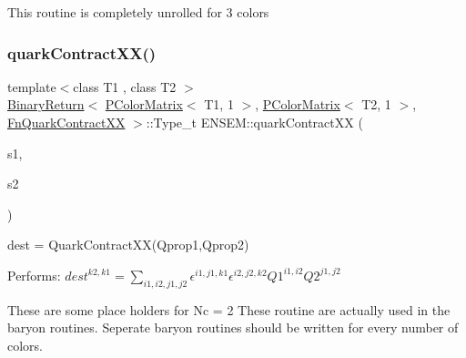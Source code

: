 This routine is completely unrolled for 3 colors \mbox{\label{group__primcolormatrix_gadb40ddb5edfab27bf7bb4b8cd7430ad6}} 
\subsubsection{\texorpdfstring{quarkContractXX()}{quarkContractXX()}\hspace{0.1cm}{\footnotesize\ttfamily [2/4]}}
{\footnotesize\ttfamily template$<$class T1 , class T2 $>$ \\
\mbox{\hyperlink{structENSEM_1_1BinaryReturn}{Binary\+Return}}$<$ \mbox{\hyperlink{classENSEM_1_1PColorMatrix}{P\+Color\+Matrix}}$<$ T1, 1 $>$, \mbox{\hyperlink{classENSEM_1_1PColorMatrix}{P\+Color\+Matrix}}$<$ T2, 1 $>$, \mbox{\hyperlink{structENSEM_1_1FnQuarkContractXX}{Fn\+Quark\+Contract\+XX}} $>$\+::Type\+\_\+t E\+N\+S\+E\+M\+::quark\+Contract\+XX (\begin{DoxyParamCaption}\item[{const \mbox{\hyperlink{classENSEM_1_1PColorMatrix}{P\+Color\+Matrix}}$<$ T1, 1 $>$ \&}]{s1,  }\item[{const \mbox{\hyperlink{classENSEM_1_1PColorMatrix}{P\+Color\+Matrix}}$<$ T2, 1 $>$ \&}]{s2 }\end{DoxyParamCaption})\hspace{0.3cm}{\ttfamily [inline]}}



dest = Quark\+Contract\+X\+X(\+Qprop1,\+Qprop2) 

Performs\+: $dest^{k2,k1} = \sum_{i1,i2,j1,j2} \epsilon^{i1,j1,k1}\epsilon^{i2,j2,k2} Q1^{i1,i2} Q2^{j1,j2}$

These are some place holders for Nc = 2 These routine are actually used in the baryon routines. Seperate baryon routines should be written for every number of colors. \mbox{\label{group__primcolormatrix_gaeaaf0956a43ba474c9f772480094c1f5}} 
